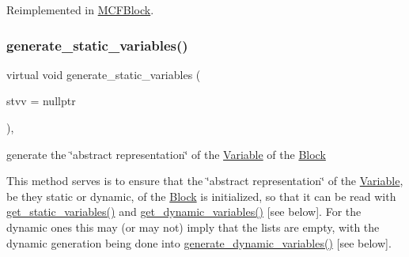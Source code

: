 Reimplemented in \mbox{\hyperlink{class_s_m_spp__di__unipi__it_1_1_m_c_f_block_a33f94035590874ef8616982e11e7bb43}{M\+C\+F\+Block}}.

\mbox{\label{class_s_m_spp__di__unipi__it_1_1_block_acd79fd0980af547f2f06241cb989094e}} 
\subsubsection{\texorpdfstring{generate\+\_\+static\+\_\+variables()}{generate\_static\_variables()}}
{\footnotesize\ttfamily virtual void generate\+\_\+static\+\_\+variables (\begin{DoxyParamCaption}\item[{\mbox{\hyperlink{class_s_m_spp__di__unipi__it_1_1_configuration}{Configuration}} $\ast$}]{stvv = {\ttfamily nullptr} }\end{DoxyParamCaption})\hspace{0.3cm}{\ttfamily [inline]}, {\ttfamily [virtual]}}



generate the \char`\"{}abstract representation\char`\"{} of the \mbox{\hyperlink{class_s_m_spp__di__unipi__it_1_1_variable}{Variable}} of the \mbox{\hyperlink{class_s_m_spp__di__unipi__it_1_1_block}{Block}} 

This method serves is to ensure that the \char`\"{}abstract representation\char`\"{} of the \mbox{\hyperlink{class_s_m_spp__di__unipi__it_1_1_variable}{Variable}}, be they static or dynamic, of the \mbox{\hyperlink{class_s_m_spp__di__unipi__it_1_1_block}{Block}} is initialized, so that it can be read with \mbox{\hyperlink{class_s_m_spp__di__unipi__it_1_1_block_a6ca8b345bb506a8ac45eef39887bebea}{get\+\_\+static\+\_\+variables()}} and \mbox{\hyperlink{class_s_m_spp__di__unipi__it_1_1_block_a9c17adfb0c344b44e163d40f7fc6926f}{get\+\_\+dynamic\+\_\+variables()}} \mbox{[}see below\mbox{]}. For the dynamic ones this may (or may not) imply that the lists are empty, with the dynamic generation being done into \mbox{\hyperlink{class_s_m_spp__di__unipi__it_1_1_block_ab90d0f60518eee75370e29c95bae4522}{generate\+\_\+dynamic\+\_\+variables()}} \mbox{[}see below\mbox{]}.

